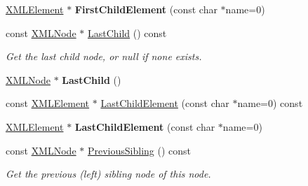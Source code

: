 \begin{DoxyCompactItemize}
\mbox{\label{classtinyxml2_1_1_x_m_l_node_af1e0e475cc27d5e7eeaf4d732691b741}} 
\mbox{\hyperlink{classtinyxml2_1_1_x_m_l_element}{X\+M\+L\+Element}} $\ast$ {\bfseries First\+Child\+Element} (const char $\ast$name=0)
\item 
\mbox{\label{classtinyxml2_1_1_x_m_l_node_a9b8583a277e8e26f4cbbb5492786778e}} 
const \mbox{\hyperlink{classtinyxml2_1_1_x_m_l_node}{X\+M\+L\+Node}} $\ast$ \mbox{\hyperlink{classtinyxml2_1_1_x_m_l_node_a9b8583a277e8e26f4cbbb5492786778e}{Last\+Child}} () const
\begin{DoxyCompactList}\small\item\em Get the last child node, or null if none exists. \end{DoxyCompactList}\item 
\mbox{\label{classtinyxml2_1_1_x_m_l_node_ad7552c8cb1dc0cb6f3bdc14a9d115dbf}} 
\mbox{\hyperlink{classtinyxml2_1_1_x_m_l_node}{X\+M\+L\+Node}} $\ast$ {\bfseries Last\+Child} ()
\item 
const \mbox{\hyperlink{classtinyxml2_1_1_x_m_l_element}{X\+M\+L\+Element}} $\ast$ \mbox{\hyperlink{classtinyxml2_1_1_x_m_l_node_a609e02f02044f39b928d1a3e0de9f532}{Last\+Child\+Element}} (const char $\ast$name=0) const
\item 
\mbox{\label{classtinyxml2_1_1_x_m_l_node_a1b77a8194d059665a4412ebfea276878}} 
\mbox{\hyperlink{classtinyxml2_1_1_x_m_l_element}{X\+M\+L\+Element}} $\ast$ {\bfseries Last\+Child\+Element} (const char $\ast$name=0)
\item 
\mbox{\label{classtinyxml2_1_1_x_m_l_node_aac667c513d445f8b783e1e15ef9d3551}} 
const \mbox{\hyperlink{classtinyxml2_1_1_x_m_l_node}{X\+M\+L\+Node}} $\ast$ \mbox{\hyperlink{classtinyxml2_1_1_x_m_l_node_aac667c513d445f8b783e1e15ef9d3551}{Previous\+Sibling}} () const
\begin{DoxyCompactList}\small\item\em Get the previous (left) sibling node of this node. \end{DoxyCompactList}\item 
\mbox{\label{classtinyxml2_1_1_x_m_l_node_ae760e5e7e766df1d2cf3bb4a847876d6}} 

\end{DoxyCompactItemize}
